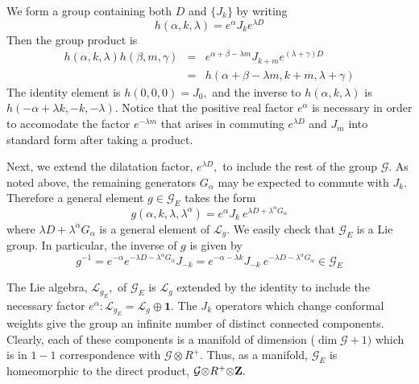 \documentclass[a4paper,12pt]{article}
\begin{document}
We form a group containing both $D$ and $\{J_{k}\}$ by writing 
\begin{equation}
h(\alpha ,k,\lambda )=e^{\alpha }J_{k}e^{\lambda D}
\end{equation}
Then the group product is 
\begin{eqnarray}
h(\alpha ,k,\lambda )h(\beta ,m,\gamma ) &=&e^{\alpha +\beta -\lambda
m}J_{k+m}e^{(\lambda +\gamma )D}  \label{Mult law} \\
&=&h(\alpha +\beta -\lambda m,k+m,\lambda +\gamma )
\end{eqnarray}
The identity element is $h(0,0,0)=J_{0},$ and the inverse to $h(\alpha
,k,\lambda )$ is $h(-\alpha +\lambda k,-k,-\lambda ).$ Notice that the
positive real factor $e^{\alpha }$ is necessary in order to accomodate the
factor $e^{-\lambda m}$ that arises in commuting $e^{\lambda D}$ and $J_{m}$
into standard form after taking a product.

Next, we extend the dilatation factor, $e^{\lambda D},$ to include the rest
of the group $\mathcal{G}$. As noted above, the remaining generators $%
G_{\alpha }$ may be expected to commute with $J_{k}$. Therefore a general
element $g\in \mathcal{G}_{E}$ takes the form 
\begin{equation}
g(\alpha ,k,\lambda ,\lambda ^{\alpha })=e^{\alpha }J_{k}\ e^{\lambda
D+\lambda ^{\alpha }G_{\alpha }}  \label{Extended group element}
\end{equation}
where $\lambda D+\lambda ^{\alpha }G_{\alpha }$ is a general element of $%
\mathcal{L}_{g}$. We easily check that $\mathcal{G}_{E}$ is a Lie group. In
particular, the inverse of $g$ is given by 
\begin{equation}
g^{-1}=e^{-\alpha }e^{-\lambda D-\lambda ^{\alpha }G_{\alpha
}}J_{-k}=e^{-\alpha -\lambda k}J_{-k}\ e^{-\lambda D-\lambda ^{\alpha
}G_{\alpha }}\in \mathcal{G}_{E}
\end{equation}

The Lie algebra, $\mathcal{L}_{g_{E}},$ of $\mathcal{G}_{E}$ is $\mathcal{L}%
_{g}$ extended by the identity to include the necessary factor $e^{\alpha }:%
\mathcal{L}_{g_{E}}=\mathcal{L}_{g}\oplus \mathbf{1}.$ The $J_{k}$ operators
which change conformal weights give the group an infinite number of distinct
connected components. Clearly, each of these components is a manifold of
dimension ($\dim \mathcal{G}+1)$ which is in $1-1$ correspondence with $%
\mathcal{G\otimes }R^{+}$. Thus, as a manifold, $\mathcal{G}_{E}$ is
homeomorphic to the direct product, $\mathcal{G\otimes }R^{+}\mathcal{%
\otimes }\mathbf{Z.}$
\end{document}
